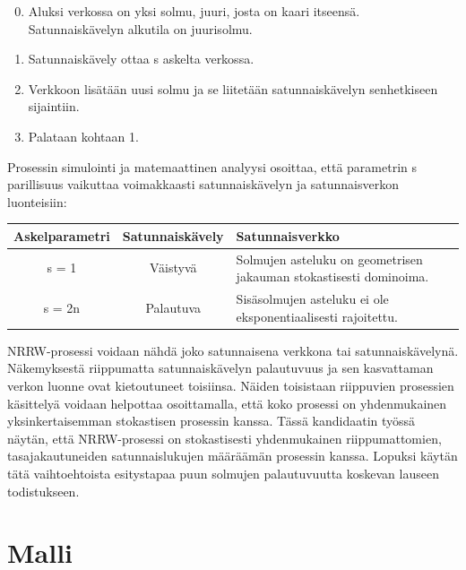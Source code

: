 \documentclass[finnish, 12pt, a4paper, sci, utf8, pdfa]{aaltothesis}
\begin{document}
\begin{enumerate}[noitemsep]
   \setcounter{enumi}{-1}
   \item Aluksi verkossa on yksi solmu, juuri, josta on kaari itseensä. Satunnaiskävelyn alkutila on juurisolmu.
   \item Satunnaiskävely ottaa s askelta verkossa.
   \item Verkkoon lisätään uusi solmu ja se liitetään satunnaiskävelyn senhetkiseen sijaintiin.
   \item Palataan kohtaan 1.
\end{enumerate}

Prosessin simulointi ja matemaattinen analyysi osoittaa, että parametrin s parillisuus vaikuttaa voimakkaasti satunnaiskävelyn ja satunnaisverkon luonteisiin:

\begin{table}[htb]
   \begin{center}
   \begin{tabular}{|c|c|p{7.5cm}|}
   \hline
   \textbf{Askelparametri} & \textbf{Satunnaiskävely} & \textbf{Satunnaisverkko} \\ \hline
   s = 1          & Väistyvä        & Solmujen asteluku on geometrisen jakauman stokastisesti dominoima. \\ \hline
   s = 2n         & Palautuva       & Sisäsolmujen asteluku ei ole eksponentiaalisesti rajoitettu. \\ \hline
   \end{tabular}
   \end{center}
\end{table}

NRRW-prosessi voidaan nähdä joko satunnaisena verkkona tai satunnaiskävelynä. Näkemyksestä riippumatta satunnaiskävelyn palautuvuus ja sen kasvattaman verkon luonne ovat kietoutuneet toisiinsa. Näiden toisistaan riippuvien prosessien käsittelyä voidaan helpottaa osoittamalla, että koko prosessi on yhdenmukainen yksinkertaisemman stokastisen prosessin kanssa. Tässä kandidaatin työssä näytän, että NRRW-prosessi on stokastisesti yhdenmukainen riippumattomien, tasajakautuneiden satunnaislukujen määräämän prosessin kanssa. Lopuksi käytän tätä vaihtoehtoista esitystapaa puun solmujen palautuvuutta koskevan lauseen todistukseen.

\clearpage

\section{Malli}
\end{document}
